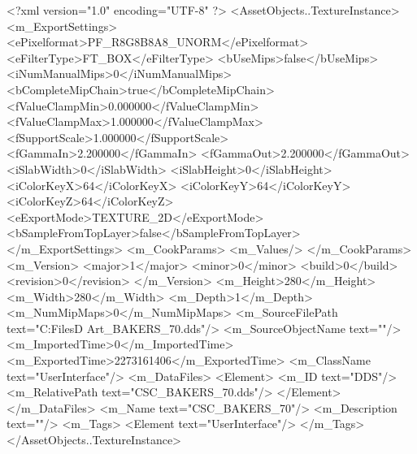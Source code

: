 <?xml version="1.0" encoding="UTF-8" ?>
<AssetObjects..TextureInstance>
	<m_ExportSettings>
		<ePixelformat>PF_R8G8B8A8_UNORM</ePixelformat>
		<eFilterType>FT_BOX</eFilterType>
		<bUseMips>false</bUseMips>
		<iNumManualMips>0</iNumManualMips>
		<bCompleteMipChain>true</bCompleteMipChain>
		<fValueClampMin>0.000000</fValueClampMin>
		<fValueClampMax>1.000000</fValueClampMax>
		<fSupportScale>1.000000</fSupportScale>
		<fGammaIn>2.200000</fGammaIn>
		<fGammaOut>2.200000</fGammaOut>
		<iSlabWidth>0</iSlabWidth>
		<iSlabHeight>0</iSlabHeight>
		<iColorKeyX>64</iColorKeyX>
		<iColorKeyY>64</iColorKeyY>
		<iColorKeyZ>64</iColorKeyZ>
		<eExportMode>TEXTURE_2D</eExportMode>
		<bSampleFromTopLayer>false</bSampleFromTopLayer>
	</m_ExportSettings>
	<m_CookParams>
		<m_Values/>
	</m_CookParams>
	<m_Version>
		<major>1</major>
		<minor>0</minor>
		<build>0</build>
		<revision>0</revision>
	</m_Version>
	<m_Height>280</m_Height>
	<m_Width>280</m_Width>
	<m_Depth>1</m_Depth>
	<m_NumMipMaps>0</m_NumMipMaps>
	<m_SourceFilePath text="C:\Users\Shadow\Desktop\Working Files\2D Art\Quarters\Bakers\CSC_BAKERS_70.dds"/>
	<m_SourceObjectName text=""/>
	<m_ImportedTime>0</m_ImportedTime>
	<m_ExportedTime>2273161406</m_ExportedTime>
	<m_ClassName text="UserInterface"/>
	<m_DataFiles>
		<Element>
			<m_ID text="DDS"/>
			<m_RelativePath text="CSC_BAKERS_70.dds"/>
		</Element>
	</m_DataFiles>
	<m_Name text="CSC_BAKERS_70"/>
	<m_Description text=""/>
	<m_Tags>
		<Element text="UserInterface"/>
	</m_Tags>
</AssetObjects..TextureInstance>

